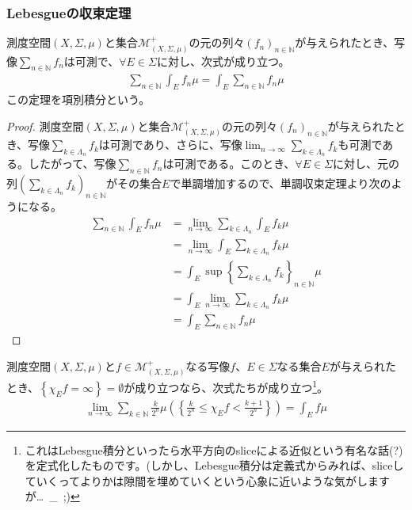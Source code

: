 \documentclass[dvipdfmx]{jsarticle}
\begin{document}
\subsubsection{Lebesgueの収束定理}%
\begin{thm}[項別積分]\label{4.6.2.1}
測度空間$(X,\varSigma,\mu)$と集合$\mathcal{M}_{(X,\varSigma,\mu)}^{+}$の元の列々$\left( f_{n} \right)_{n \in \mathbb{N}}$が与えられたとき、写像$\sum_{n \in \mathbb{N}} f_{n}$は可測で、$\forall E \in \varSigma$に対し、次式が成り立つ。
\begin{align*}
\sum_{n \in \mathbb{N}} {\int_{E} {f_{n}\mu}} = \int_{E} {\sum_{n \in \mathbb{N}} f_{n}\mu}
\end{align*}
この定理を項別積分という。
\end{thm}
\begin{proof}
測度空間$(X,\varSigma,\mu)$と集合$\mathcal{M}_{(X,\varSigma,\mu)}^{+}$の元の列々$\left( f_{n} \right)_{n \in \mathbb{N}}$が与えられたとき、写像$\sum_{k \in \varLambda_{n}} f_{k}$は可測であり、さらに、写像$\lim_{n \rightarrow \infty}{\sum_{k \in \varLambda_{n}} f_{k}}$も可測である。したがって、写像$\sum_{n \in \mathbb{N}} f_{n}$は可測である。このとき、$\forall E \in \varSigma$に対し、元の列$\left( \sum_{k \in \varLambda_{n}} f_{k} \right)_{n \in \mathbb{N}}$がその集合$E$で単調増加するので、単調収束定理より次のようになる。
\begin{align*}
\sum_{n \in \mathbb{N}} {\int_{E} {f_{n}\mu}} &= \lim_{n \rightarrow \infty}{\sum_{k \in \varLambda_{n}} {\int_{E} {f_{k}\mu}}}\\
&= \lim_{n \rightarrow \infty}{\int_{E} {\sum_{k \in \varLambda_{n}} f_{k}\mu}}\\
&= \int_{E} {\sup\left\{ \sum_{k \in \varLambda_{n}} f_{k} \right\}_{n \in \mathbb{N}}\mu}\\
&= \int_{E} {\lim_{n \rightarrow \infty}{\sum_{k \in \varLambda_{n}} f_{k}}\mu}\\
&= \int_{E} {\sum_{n \in \mathbb{N}} f_{n}\mu}
\end{align*}
\end{proof}
\begin{thm}\label{4.6.2.2}
測度空間$(X,\varSigma,\mu)$と$f \in \mathcal{M}_{(X,\varSigma,\mu)}^{+}$なる写像$f$、$E \in \varSigma$なる集合$E$が与えられたとき、$\left\{ \chi_{E}f = \infty \right\} = \emptyset$が成り立つなら、次式たちが成り立つ\footnote{これはLebesgue積分といったら水平方向のsliceによる近似という有名な話(?)を定式化したものです。(しかし、Lebesgue積分は定義式からみれば、sliceしていくってよりかは隙間を埋めていくという心象に近いような気がしますが…\ \_\ ;)}。
\begin{align*}
\lim_{n \rightarrow \infty}{\sum_{k \in \mathbb{N}} {\frac{k}{2^{n}}\mu\left( \left\{ \frac{k}{2^{n}} \leq \chi_{E}f < \frac{k + 1}{2^{n}} \right\} \right)}} = \int_{E} {f\mu}
\end{align*}
\end{thm}
\end{document}
